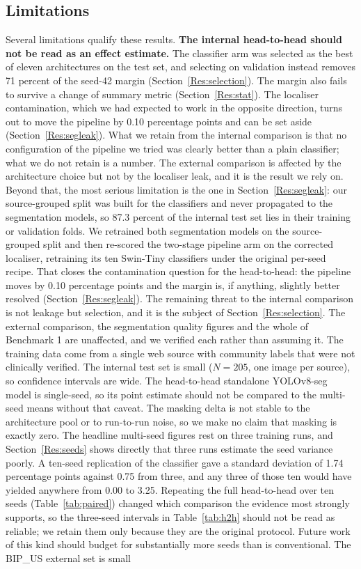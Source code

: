 \documentclass{melba}
\begin{document}
\subsection{Limitations}
\label{Dis:lim}
Several limitations qualify these results. \textbf{The internal head-to-head should not be read as an effect estimate.} The classifier arm was selected as the best of eleven architectures on the test set, and selecting on validation instead removes 71 percent of the seed-42 margin (Section~\ref{Res:selection}). The margin also fails to survive a change of summary metric (Section~\ref{Res:stat}). The localiser contamination, which we had expected to work in the opposite direction, turns out to move the pipeline by 0.10 percentage points and can be set aside (Section~\ref{Res:segleak}). What we retain from the internal comparison is that no configuration of the pipeline we tried was clearly better than a plain classifier; what we do not retain is a number. The external comparison is affected by the architecture choice but not by the localiser leak, and it is the result we rely on. Beyond that, the most serious limitation is the one in Section~\ref{Res:segleak}: our source-grouped split was built for the classifiers and never propagated to the segmentation models, so 87.3 percent of the internal test set lies in their training or validation folds. We retrained both segmentation models on the source-grouped split and then re-scored the two-stage pipeline arm on the corrected localiser, retraining its ten Swin-Tiny classifiers under the original per-seed recipe. That closes the contamination question for the head-to-head: the pipeline moves by 0.10 percentage points and the margin is, if anything, slightly better resolved (Section~\ref{Res:segleak}). The remaining threat to the internal comparison is not leakage but selection, and it is the subject of Section~\ref{Res:selection}. The external comparison, the segmentation quality figures and the whole of Benchmark 1 are unaffected, and we verified each rather than assuming it. The training data come from a single web source with community labels that were not clinically verified. The internal test set is small ($N=205$, one image per source), so confidence intervals are wide. The head-to-head standalone YOLOv8-seg model is single-seed, so its point estimate should not be compared to the multi-seed means without that caveat. The masking delta is not stable to the architecture pool or to run-to-run noise, so we make no claim that masking is exactly zero. The headline multi-seed figures rest on three training runs, and Section~\ref{Res:seeds} shows directly that three runs estimate the seed variance poorly. A ten-seed replication of the classifier gave a standard deviation of 1.74 percentage points against 0.75 from three, and any three of those ten would have yielded anywhere from 0.00 to 3.25. Repeating the full head-to-head over ten seeds (Table~\ref{tab:paired}) changed which comparison the evidence most strongly supports, so the three-seed intervals in Table~\ref{tab:h2h} should not be read as reliable; we retain them only because they are the original protocol. Future work of this kind should budget for substantially more seeds than is conventional. The BIP\_US external set is small 
\end{document}
